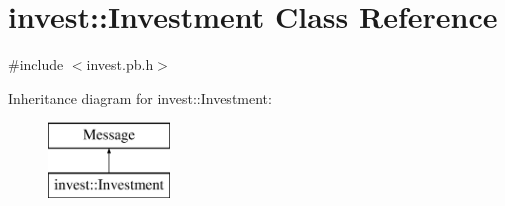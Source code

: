 \hypertarget{classinvest_1_1_investment}{}\section{invest\+:\+:Investment Class Reference}
\label{classinvest_1_1_investment}


{\ttfamily \#include $<$invest.\+pb.\+h$>$}

Inheritance diagram for invest\+:\+:Investment\+:\begin{figure}[H]
\begin{center}
\leavevmode
\includegraphics[height=2.000000cm]{classinvest_1_1_investment}
\end{center}
\end{figure}
